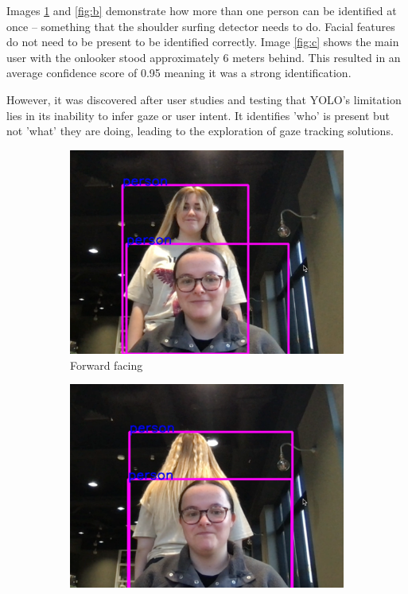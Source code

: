 \documentclass[12pt]{article}
\theoremstyle{plain}
\theoremstyle{definition}
\begin{document}
Images \ref{fig:a} and \ref{fig:b} demonstrate how more than one person can be identified at once – something that the shoulder surfing detector needs to do. Facial features do not need to be present to be identified correctly. Image \ref{fig:c} shows the main user with the onlooker stood approximately 6 meters behind. This resulted in an average confidence score of 0.95 meaning it was a strong identification.

However, it was discovered after user studies and testing that YOLO's limitation lies in its inability to infer gaze or user intent. It identifies 'who' is present but not 'what' they are doing, leading to the exploration of gaze tracking solutions.

\begin{figure}[h!]
     \centering
     \begin{subfigure}[b]{0.3\textwidth}
         \centering
         \includegraphics[width=\textwidth]{img/fig1-img1.png}
         \caption{Forward facing}
         \label{fig:a}
     \end{subfigure}
     \hfill
     \begin{subfigure}[b]{0.3\textwidth}
         \centering
         \includegraphics[width=\textwidth]{img/fig1-img2.png}

\end{subfigure}
\end{figure}
\end{document}
